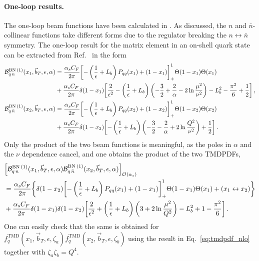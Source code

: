 \documentclass[11pt,a4paper]{article}
\DeclareRobustCommand{\eq}[1]{Eq.~\eqref{eq:#1}}
\DeclareRobustCommand{\mycite}[1]{Ref.~\cite{#1}}
\newcommand{\eps}{\epsilon}
\newcommand{\cB}{\mathcal{B}}
\newcommand{\cO}{\mathcal{O}}
\newcommand{\nn}{\nonumber}
\newcommand{\bn}{{\bar{n}}}
\newcommand{\as}{\alpha_s}
\newcommand\TMD{\mathrm{TMD}}
\newcommand{\bt}{\vec b_T}
\begin{document}
\paragraph{One-loop results.}
The one-loop beam functions have been calculated in \cite{Becher:2010tm}.
As discussed, the $n$ and $\bn$-collinear functions take different forms
due to the regulator breaking the $n\leftrightarrow\bn$ symmetry.
The one-loop result for the matrix element in an on-shell quark state can be extracted from \mycite{Becher:2010tm} in the form
\begin{align}
 \cB^{{\rm BN}\,(1)}_{q\,n}(x_1, \bt, \eps, \alpha) &
 = \frac{\as C_F}{2\pi} \biggl[ - \left(\frac{1}{\eps} + L_b\right) P_{qq}(x_1) + (1-x_1) \biggr]_+^1\Theta(1-x_1)\Theta(x_1)
 \\\nn&
 + \frac{\as C_F}{2\pi}\delta(1-x_1) \biggl[ \frac{2}{\eps^2}
   - \left(\frac{1}{\eps} + L_b\right) \left(-\frac{3}{2} + \frac{2}{\alpha} - 2 \ln\frac{\mu^2}{\nu^2} \right)
 - L_b^2 - \frac{\pi^2}{6} + \frac{1}{2} \biggr]
\,,\\
 \cB^{{\rm BN}\,(1)}_{q\,\bn}(x_2, \bt, \eps, \alpha) &
 = \frac{\as C_F}{2\pi} \biggl[ - \left(\frac{1}{\eps} + L_b\right) P_{qq}(x_2) + (1-x_2)\biggr]_+^1\Theta(1-x_2)\Theta(x_2)
 \nn\\&
 + \frac{\as C_F}{2\pi} \delta(1-x_2) \biggl[ - \left(\frac{1}{\eps} + L_b\right)  \left( -\frac{3}{2} - \frac{2}{\alpha} + 2 \ln\frac{Q^2}{\nu^2} \right)
  + \frac{1}{2} \biggr]
\,.\end{align}
Only the product of the two beam functions is meaningful, as the poles in $\alpha$ and the $\nu$ dependence cancel,
and one obtains the product of the two TMDPDFs,
\begin{align}
 &\Bigl[\cB^{{\rm BN}\,(1)}_{q\,n}(x_1, \bt, \eps, \alpha) \cB^{{\rm BN}\,(1)}_{q\,\bn}(x_2, \bt, \eps, \alpha)\Bigr]_{\cO(\as)}
 \nn\\&
 = \frac{\as C_F}{2\pi} \biggl\{ \delta(1-x_2) \biggl[ - \left(\frac{1}{\eps} + L_b\right) P_{qq}(x_1) + (1-x_1)  \biggr]_+^1\Theta(1-x_1)\Theta(x_1)
  + (x_1 \leftrightarrow x_2) \biggr\}
  \nn\\&
  + \frac{\as C_F}{2\pi} \delta(1-x_1) \delta(1-x_2) \biggl[
   \frac{2}{\eps^2} + \left(\frac{1}{\eps} + L_b\right) \left( 3 + 2 \ln\frac{\mu^2}{Q^2} \right)
   - L_b^2 + 1  - \frac{\pi^2}{6}\biggr]
\,.\end{align}
One can easily check that the same is obtained for $f_q^\TMD(x_1,\bt,\eps,\zeta_a) f_q^\TMD(x_2,\bt,\eps,\zeta_b)$ using the result in \eq{tmdpdf_nlo} together with $\zeta_a \zeta_b = Q^4$.
\end{document}
